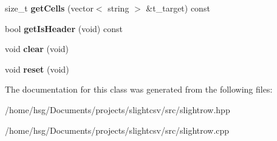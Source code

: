 \begin{DoxyCompactItemize}
size\+\_\+t {\bfseries get\+Cells} (vector$<$ string $>$ \&t\+\_\+target) const
\item 
\mbox{\label{classutils_1_1SlightRow_a702f97c32ea40303cd83a540404a6eca}} 
bool {\bfseries get\+Is\+Header} (void) const
\item 
\mbox{\label{classutils_1_1SlightRow_abd5fa1b875373906c801611a9e051c31}} 
void {\bfseries clear} (void)
\item 
\mbox{\label{classutils_1_1SlightRow_ad323829080b35608b2e5764ed735d4dc}} 
void {\bfseries reset} (void)
\end{DoxyCompactItemize}


The documentation for this class was generated from the following files\+:\begin{DoxyCompactItemize}
\item 
/home/hsg/\+Documents/projects/slightcsv/src/slightrow.\+hpp\item 
/home/hsg/\+Documents/projects/slightcsv/src/slightrow.\+cpp\end{DoxyCompactItemize}
